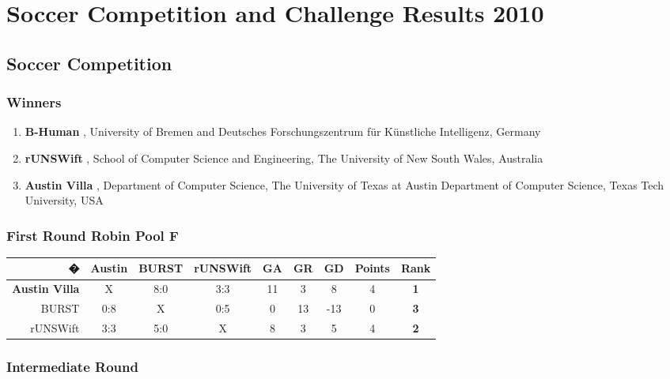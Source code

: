 \documentclass[pdftex,11pt,a4paper]{report}
\begin{document}
\chapter{Soccer Competition and Challenge Results 2010} \label{appendixResults} 
 
\section{Soccer Competition}
 
\subsection*{Winners}
\begin{enumerate}
\item \textbf{B-Human}
, University of Bremen and Deutsches Forschungszentrum f\"ur K\"unstliche Intelligenz, Germany 
\item \textbf{rUNSWift}
, School of Computer Science and Engineering, The University of New South Wales, Australia 
\item \textbf{Austin Villa}
, Department of Computer Science, The University of Texas at Austin Department of Computer Science, Texas Tech University, USA 
\end{enumerate}

\subsection*{First Round Robin Pool F}

\begin{center}
   \begin{tabular}{rcccccccc}
      � &Austin &BURST &rUNSWift &GA &GR &GD &Points &Rank \\
      \hline
      \textbf{Austin Villa} &X &8:0 &3:3 &11 &3 &8 &4 &\textbf{1} \\
      BURST &0:8 &X &0:5 &0 &13 &-13 &0 &\textbf{3} \\
      rUNSWift &3:3 &5:0 &X &8 &3 &5 &4 &\textbf{2}
   \end{tabular}
\end{center}

\subsection*{Intermediate Round}
\end{document}
